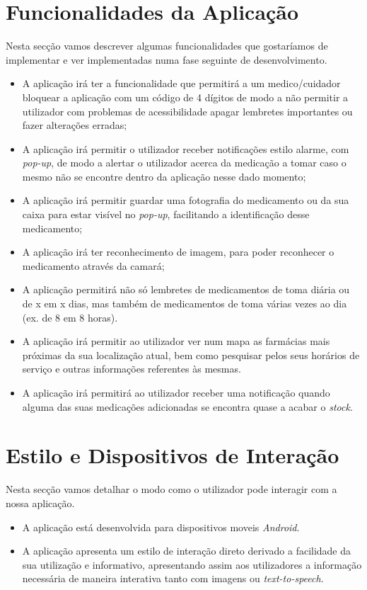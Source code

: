 \documentclass[a4paper]{article}
\begin{document}
\section{Funcionalidades da Aplicação}\label{section:features}
Nesta secção vamos descrever algumas funcionalidades que gostaríamos de implementar e ver implementadas numa fase seguinte de desenvolvimento.

\begin{itemize}
    \item A aplicação irá ter a funcionalidade que permitirá a um medico/cuidador 
    bloquear a aplicação com um código de 4 dígitos de modo a não permitir a utilizador com problemas de acessibilidade apagar lembretes importantes ou fazer alterações erradas;
    \item A aplicação irá permitir o utilizador receber notificações estilo alarme, com \textit{pop-up}, de modo a alertar o utilizador acerca da medicação a tomar caso o mesmo não se encontre dentro da aplicação nesse dado momento;
    \item A aplicação irá permitir guardar uma fotografia do medicamento ou da sua caixa para estar visível no \textit{pop-up}, facilitando a identificação desse medicamento;
    \item A aplicação irá ter reconhecimento de imagem, para poder reconhecer o medicamento através da camará;
    \item A aplicação permitirá não só lembretes de medicamentos de toma diária ou de x em x dias, mas também de medicamentos de toma várias vezes ao dia (ex. de 8 em 8 horas).
    \item A aplicação irá permitir ao utilizador ver num mapa as farmácias mais próximas da sua localização atual, bem como pesquisar pelos seus horários de serviço e outras informações referentes às mesmas.
    \item A aplicação irá permitirá ao utilizador receber uma notificação quando alguma das suas medicações adicionadas se encontra quase a acabar o \textit{stock}.
\end{itemize}

\section{Estilo e Dispositivos de Interação}\label{section:style_n_use}
Nesta secção vamos detalhar o modo como o utilizador pode interagir com a nossa aplicação.

\begin{itemize}
    \item A aplicação está desenvolvida para dispositivos moveis \textit{Android}.
    \item A aplicação apresenta um estilo de interação direto derivado a facilidade da sua utilização e informativo, apresentando assim aos utilizadores a informação necessária de maneira interativa tanto com imagens ou \textit{text-to-speech}.
\end{itemize}
\newpage
\end{document}
